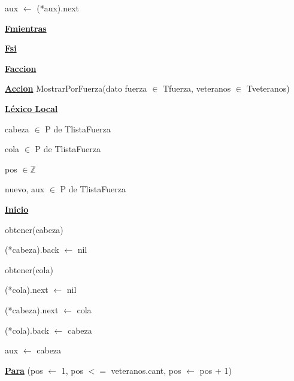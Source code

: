 \documentclass{article}
\begin{document}
                    \hspace{20mm}aux $\leftarrow$ (*aux).next

                \hspace{16mm}\underline{\textbf{Fmientras}}

            \hspace{12mm}\underline{\textbf{Fsi}}

    \hspace{4mm}\underline{\textbf{Faccion}}

    \vspace{4mm}

    \hspace{4mm}\underline{\textbf{Accion}} MostrarPorFuerza(dato fuerza $\in$ Tfuerza, veteranos $\in$ Tveteranos)

        \hspace{8mm}\underline{\textbf{Léxico Local}}

            \hspace{12mm}cabeza $\in$ P de TlistaFuerza

            \hspace{12mm}cola $\in$ P de TlistaFuerza

            \hspace{12mm}pos $\in \mathbb{Z}$

            \hspace{12mm}nuevo, aux $\in$ P de TlistaFuerza

        \hspace{8mm}\underline{\textbf{Inicio}}

            \hspace{12mm}obtener(cabeza)

            \hspace{12mm}(*cabeza).back $\leftarrow$ nil

            \hspace{12mm}obtener(cola)

            \hspace{12mm}(*cola).next $\leftarrow$ nil

            \hspace{12mm}(*cabeza).next $\leftarrow$ cola

            \hspace{12mm}(*cola).back $\leftarrow$ cabeza

            \hspace{12mm}aux $\leftarrow$ cabeza

            \hspace{12mm}\underline{\textbf{Para}} (pos $\leftarrow$ 1, pos $<=$ veteranos.cant, pos $\leftarrow$ pos + 1)
\end{document}
